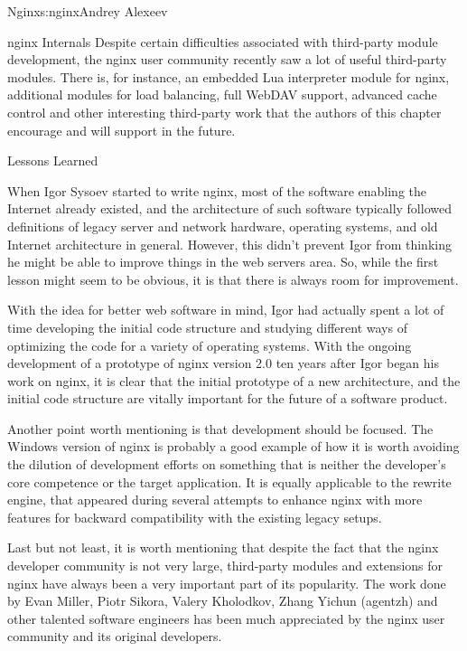 \begin{aosachapter}{Nginx}{s:nginx}{Andrey Alexeev}
\begin{aosasect1}{nginx Internals}
Despite certain difficulties associated with third-party module
development, the nginx user community recently saw a lot of useful
third-party modules. There is, for instance, an embedded Lua
interpreter module for nginx, additional modules for load balancing,
full WebDAV support, advanced cache control and other interesting
third-party work that the authors of this chapter encourage and will
support in the future.

\end{aosasect1}

\begin{aosasect1}{Lessons Learned}

When Igor Sysoev started to write nginx, most of the software enabling
the Internet already existed, and the architecture of such software
typically followed definitions of legacy server and network hardware,
operating systems, and old Internet architecture in general. However,
this didn't prevent Igor from thinking he might be able to improve
things in the web servers area. So, while the first lesson might seem
to be obvious, it is that there is always room for improvement.

With the idea for better web software in mind, Igor had actually spent
a lot of time developing the initial code structure and studying
different ways of optimizing the code for a variety of operating
systems. With the ongoing development of a prototype of nginx version
2.0 ten years after Igor began his work on nginx, it is clear that the
initial prototype of a new architecture, and the initial code
structure are vitally important for the future of a software product.

Another point worth mentioning is that development should be
focused. The Windows version of nginx is probably a good example of
how it is worth avoiding the dilution of development efforts on
something that is neither the developer's core competence or the
target application. It is equally applicable to the rewrite engine,
that appeared during several attempts to enhance nginx with more
features for backward compatibility with the existing legacy setups.

Last but not least, it is worth mentioning that despite the fact that
the nginx developer community is not very large, third-party modules
and extensions for nginx have always been a very important part of its
popularity. The work done by Evan Miller, Piotr Sikora, Valery
Kholodkov, Zhang Yichun (agentzh) and other talented software
engineers has been much appreciated by the nginx user community and
its original developers.

\end{aosasect1}

\end{aosachapter}
